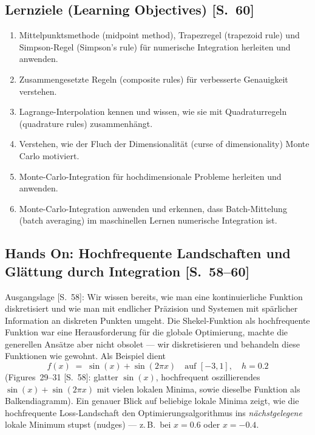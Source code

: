 \subsection{Lernziele (Learning Objectives) [S.~60]}
\begin{enumerate}[itemsep=1pt]
  \item Mittelpunktsmethode (midpoint method), Trapezregel (trapezoid rule) und
        Simpson-Regel (Simpson's rule) für numerische Integration herleiten und
        anwenden.
  \item Zusammengesetzte Regeln (composite rules) für verbesserte Genauigkeit
        verstehen.
  \item Lagrange-Interpolation kennen und wissen, wie sie mit Quadraturregeln
        (quadrature rules) zusammenhängt.
  \item Verstehen, wie der Fluch der Dimensionalität (curse of dimensionality)
        Monte Carlo motiviert.
  \item Monte-Carlo-Integration für hochdimensionale Probleme herleiten und anwenden.
  \item Monte-Carlo-Integration anwenden und erkennen, dass Batch-Mittelung
        (batch averaging) im maschinellen Lernen numerische Integration ist.
\end{enumerate}

\subsection{Hands On: Hochfrequente Landschaften und Glättung durch Integration [S.~58--60]}

Ausgangslage [S.~58]: Wir wissen bereits, wie man eine kontinuierliche Funktion
diskretisiert und wie man mit endlicher Präzision und Systemen mit spärlicher
Information an diskreten Punkten umgeht. Die Shekel-Funktion als hochfrequente
Funktion war eine Herausforderung für die globale Optimierung, machte die generellen
Ansätze aber nicht obsolet --- wir diskretisieren und behandeln diese Funktionen wie
gewohnt. Als Beispiel dient
\[
  f(x) \;=\; \sin(x) + \sin(2\pi x) \quad \text{auf } [-3, 1], \quad h = 0.2
\]
(Figures~29--31 [S.~58]: glatter $\sin(x)$, hochfrequent oszillierendes
$\sin(x)+\sin(2\pi x)$ mit vielen lokalen Minima, sowie dieselbe Funktion als
Balkendiagramm). Ein genauer Blick auf beliebige lokale Minima zeigt, wie die
hochfrequente Loss-Landschaft den Optimierungsalgorithmus ins \emph{nächstgelegene}
lokale Minimum stupst (nudges) --- z.\,B.\ bei $x = 0.6$ oder $x = -0.4$.

